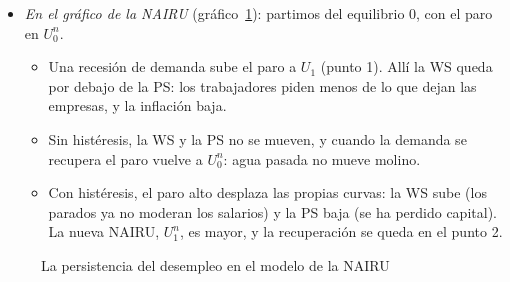 \documentclass[11pt]{article}
\begin{document}
\begin{itemize}
\item \emph{En el gráfico de la NAIRU} (gráfico~\ref{fig:histeresis-ws-ps}): partimos del equilibrio 0, con el paro en $U^n_0$.
  \begin{itemize}
  \item Una recesión de demanda sube el paro a $U_1$ (punto 1). Allí la WS queda por debajo de la PS: los trabajadores piden menos de lo que dejan las empresas, y la inflación baja.
  \item Sin histéresis, la WS y la PS no se mueven, y cuando la demanda se recupera el paro vuelve a $U^n_0$: agua pasada no mueve molino.
  \item Con histéresis, el paro alto desplaza las propias curvas: la WS sube (los parados ya no moderan los salarios) y la PS baja (se ha perdido capital). La nueva NAIRU, $U^n_1$, es mayor, y la recuperación se queda en el punto 2.
  \end{itemize}
\end{itemize}

\begin{figure}[H]
\centering
\caption{La persistencia del desempleo en el modelo de la NAIRU}\label{fig:histeresis-ws-ps}
\end{figure}
\end{document}

